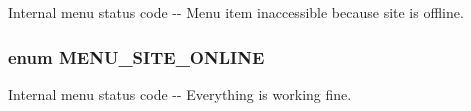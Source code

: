 \label{group__menu__status__codes_gad6222551ed027f4f367e11b11935cff9}
Internal menu status code -\/-\/ Menu item inaccessible because site is offline. \hypertarget{group__menu__status__codes_gaac31a368c93d567958be6f96e3f38425}{
\subsubsection[{MENU\_\-SITE\_\-ONLINE}]{\setlength{\rightskip}{0pt plus 5cm}enum {\bf MENU\_\-SITE\_\-ONLINE}}}
\label{group__menu__status__codes_gaac31a368c93d567958be6f96e3f38425}
Internal menu status code -\/-\/ Everything is working fine. 